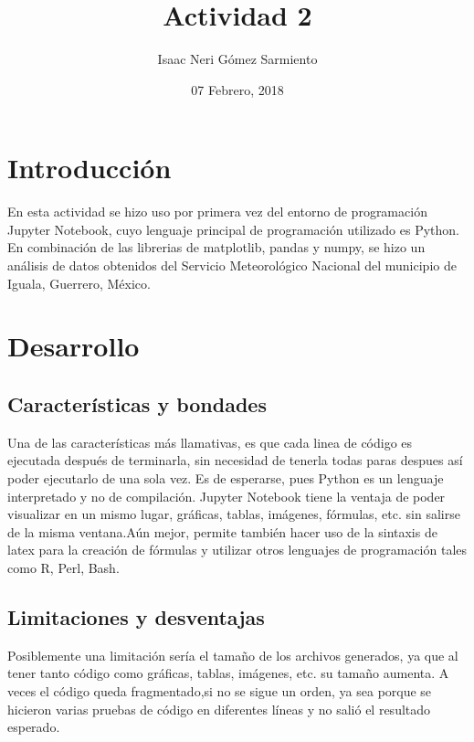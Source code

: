 \documentclass[a4paper]{article}
\title{Actividad 2}
\author{Isaac Neri Gómez Sarmiento}
\date{07 Febrero, 2018}
\begin{document}
\maketitle


\section{Introducción}

En esta actividad se hizo uso por primera vez del entorno de programación Jupyter Notebook, cuyo lenguaje principal de programación utilizado es Python. En combinación de las librerias de matplotlib, pandas y numpy, se hizo un análisis de datos obtenidos del Servicio Meteorológico Nacional del municipio de Iguala, Guerrero, México. 

\section{Desarrollo}
\subsection{Características y bondades}

Una de las características más llamativas, es que cada linea de código es ejecutada después de terminarla, sin necesidad de tenerla todas paras despues así poder ejecutarlo de una sola vez. Es de esperarse, pues Python es un lenguaje interpretado y no de compilación. Jupyter Notebook tiene la ventaja de poder visualizar en un mismo lugar, gráficas, tablas, imágenes, fórmulas, etc. sin salirse de la misma ventana.Aún mejor, permite también hacer uso de la sintaxis de latex para la creación de fórmulas y utilizar otros lenguajes de programación tales como R, Perl, Bash.

\subsection{Limitaciones y desventajas}
Posiblemente una limitación sería el tamaño de los archivos generados, ya que al tener tanto código como gráficas, tablas, imágenes, etc. su tamaño aumenta. A veces el código queda fragmentado,si no se sigue un orden, ya sea porque se hicieron varias pruebas de código en diferentes líneas y no salió el resultado esperado.
\end{document}

